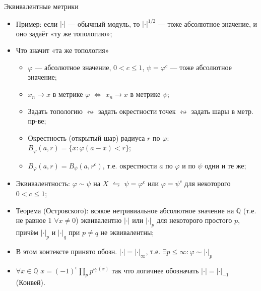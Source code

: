\documentclass[serif, aspectratio=169]{beamer}
\begin{document}
\begin{frame}{Эквивалентные метрики}
    \begin{itemize}
        \item Пример: если $|\cdot|$ --- обычный модуль, то $|\cdot|^{1/2}$ --- тоже абсолютное значение, и оно задаёт «ту же топологию»;
        \item Что значит «та же топология» 
        \begin{itemize}
            \item $\varphi$ --- абсолютное значение, $0<c\leqslant 1$, $\psi=\varphi^c$ --- тоже абсолютное значение;
            \item $x_n\to x$ в метрике $\varphi$ $\Leftrightarrow$ $x_n\to x$ в метрике $\psi$;
            \item Задать топологию $\leftrightsquigarrow$ задать окрестности точек $\leftrightsquigarrow$ задать шары в метр. пр-ве;
            \item Окрестность (открытый шар) радиуса $r$ по $\varphi$: $B_\varphi(a,r)=\{x: \varphi(a-x)<r\}$;
            \item $B_\varphi(a,r)=B_\psi(a,r^c)$, т.е. окрестности $a$ по $\varphi$ и по $\psi$ одни и те же;
        \end{itemize}
        \item Эквивалентность: $\varphi\sim\psi$ на $X$ $\leftrightharpoons$ $\psi=\varphi^c$ или $\varphi=\psi^c$ для некоторого $0<c\leqslant 1$;
        \item Теорема (Островского): всякое нетривиальное абсолютное значение на $\mathbb{Q}$ (т.е. не равное $1$ $\forall x\neq 0$) эквивалентно $|\cdot|$ или $|\cdot|_p$ для некоторого простого $p$, причём $|\cdot|_p$ и $|\cdot|_q$ при $p\neq q$ не эквивалентны;
        \item В этом контексте принято обозн. $|\cdot|=|\cdot|_\infty$, т.е. $\exists p\leqslant\infty: \varphi\sim|\cdot|_p$
        \item $\forall x\in\mathbb{Q}$ $x=(-1)^\epsilon \prod_p p^{\nu_p(x)}$ так что логичнее обозначать $|\cdot|=|\cdot|_{-1}$ (Конвей).
    \end{itemize}
    
    \note{
        \begin{itemize}
            \item ---
        \end{itemize}
    }
\end{frame}
\end{document}

